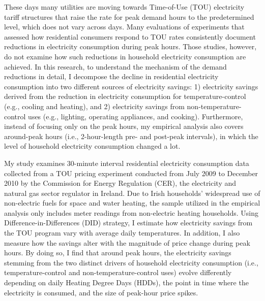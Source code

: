 These days many utilities are moving towards Time-of-Use (TOU) electricity tariff structures that raise the rate for peak demand hours to the predetermined level, which does not vary across days. Many evaluations of experiments that assessed how residential consumers respond to TOU rates consistently document reductions in electricity consumption during peak hours. Those studies, however, do not examine how such reductions in household electricity consumption are achieved. In this research, to understand the mechanism of the demand reductions in detail, I decompose the decline in residential electricity consumption into two different sources of electricity savings: 1) electricity savings derived from the reduction in electricity consumption for temperature-control (e.g., cooling and heating), and 2) electricity savings from non-temperature-control uses (e.g., lighting, operating appliances, and cooking). Furthermore, instead of focusing only on the peak hours, my empirical analysis also covers around-peak hours (i.e., 2-hour-length pre- and post-peak intervals), in which the level of household electricity consumption changed a lot.

My study examines 30-minute interval residential electricity consumption data collected from a TOU pricing experiment conducted from July 2009 to December 2010 by the Commission for Energy Regulation (CER), the electricity and natural gas sector regulator in Ireland. Due to Irish households' widespread use of non-electric fuels for space and water heating, the sample utilized in the empirical analysis only includes meter readings from non-electric heating households. Using Difference-in-Differences (DID) strategy, I estimate how electricity savings from the TOU program vary with average daily temperatures. In addition, I also measure how the savings alter with the magnitude of price change during peak hours. By doing so, I find that around peak hours, the electricity savings stemming from the two distinct drivers of household electricity consumption (i.e., temperature-control and non-temperature-control uses) evolve differently depending on daily Heating Degree Days (HDDs), the point in time where the electricity is consumed, and the size of peak-hour price spikes.

